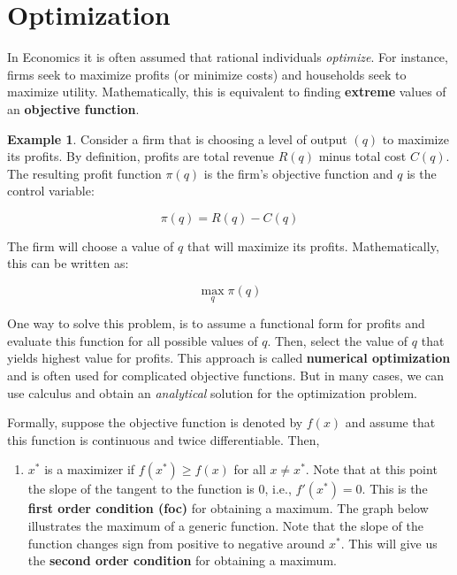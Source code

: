 \documentclass[
]{book}
\providecommand{\tightlist}{%
  \setlength{\itemsep}{0pt}\setlength{\parskip}{0pt}}
\theoremstyle{definition}
\theoremstyle{definition}
\newtheorem{example}{Example}[chapter]
\theoremstyle{definition}
\theoremstyle{definition}
\theoremstyle{remark}
\begin{document}
\hypertarget{optimization}{%
\section{Optimization}\label{optimization}}

In Economics it is often assumed that rational individuals \emph{optimize}. For instance, firms seek to maximize profits (or minimize costs) and households seek to maximize utility. Mathematically, this is equivalent to finding \textbf{extreme} values of an \textbf{objective function}.

\begin{example}
\protect\hypertarget{exm:unnamed-chunk-55}{}\label{exm:unnamed-chunk-55}Consider a firm that is choosing a level of output \((q)\) to maximize its profits. By definition, profits are total revenue \(R(q)\) minus total cost \(C(q)\). The resulting profit function \(\pi(q)\) is the firm's objective function and \(q\) is the control variable:

\[\pi(q)=R(q)- C(q)\]

The firm will choose a value of \(q\) that will maximize its profits. Mathematically, this can be written as:

\[ \max_{q} \pi(q)\]
\end{example}

One way to solve this problem, is to assume a functional form for profits and evaluate this function for all possible values of \(q\). Then, select the value of \(q\) that yields highest value for profits. This approach is called \textbf{numerical optimization} and is often used for complicated objective functions. But in many cases, we can use calculus and obtain an \emph{analytical} solution for the optimization problem.

Formally, suppose the objective function is denoted by \(f(x)\) and assume that this function is continuous and twice differentiable. Then,

\begin{enumerate}
\def\labelenumi{\arabic{enumi}.}
\tightlist
\item
  \(x^*\) is a maximizer if \(f(x^*)\geq f(x)\) for all \(x\neq x^*\). Note that at this point the slope of the tangent to the function is \(0\), i.e., \(f'(x^*)=0\). This is the \textbf{first order condition (foc)} for obtaining a maximum. The graph below illustrates the maximum of a generic function. Note that the slope of the function changes sign from positive to negative around \(x^*\). This will give us the \textbf{second order condition} for obtaining a maximum.
\end{enumerate}
\end{document}
